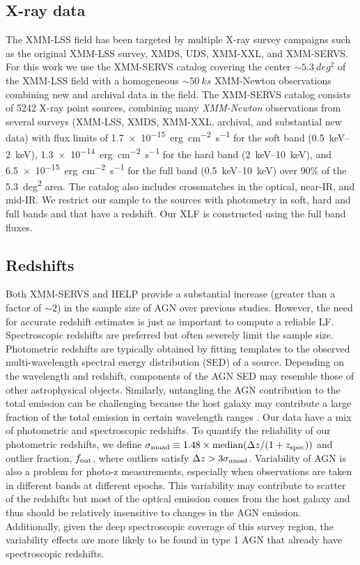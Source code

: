 \documentclass[twocolumn, trackchanges]{aastex63}
\begin{document}
\subsection{X-ray data}
The XMM-LSS field has been targeted by multiple X-ray survey campaigns such as the original XMM-LSS survey, XMDS, UDS, XMM-XXL, and XMM-SERVS.
For this work we use the XMM-SERVS catalog \citep{chen_xmm-servs_2018} covering the center $\sim \SI{5.3}{deg^2}$ of the XMM-LSS field with a homogeneous $\sim \SI{50}{ks}$ XMM-Newton observations combining
new and archival data in the field.
The XMM-SERVS catalog \citep{chen_xmm-servs_2018} consists of 5242 X-ray point sources, combining many \textit{XMM-Newton} observations from several surveys (XMM-LSS, XMDS, XMM-XXL, archival, and substantial new data) with flux limits of \SI{1.7e-15}{erg~cm^{-2}~s^{-1}} for the soft band (\SIrange[range-phrase=--, range-units=single]{0.5}{2}{keV}), \SI{1.3e-14}{erg~cm^{-2}~s^{-1}} for the hard band (\SIrange[range-phrase=--, range-units=single]{2}{10}{keV}), and \SI{6.5e-15}{erg~cm^{-2}~s^{-1}} for the full band (\SIrange[range-phrase=--, range-units=single]{0.5}{10}{keV}) over 90\% of the \SI{5.3}{deg^2} area.
The catalog also includes crossmatches in the optical, near-IR, and mid-IR.
We restrict our sample to the sources with photometry in soft, hard and full bands and that have a redshift.
Our XLF is constructed using the full band fluxes.

\subsection{Redshifts}
Both XMM-SERVS and HELP provide a substantial increase  (greater than a factor of $\sim 2$) in the sample size of AGN over previous studies. 
However, the need for accurate redshift estimates is just as important to compute a reliable LF.
Spectroscopic redshifts are preferred but often severely limit the sample size.
Photometric redshifts are typically obtained by fitting templates to the observed multi-wavelength spectral energy distribution (SED) of a source.
Depending on the wavelength and redshift, components of the AGN SED may resemble those of other astrophysical objects.
Similarly, untangling the AGN contribution to the total emission can be challenging because the host galaxy may contribute a large fraction of the total emission in certain wavelength ranges \citep{salvato_many_2019}.
Our data have a mix of photometric and spectroscopic redshifts.
To quantify the reliability of our photometric redshifts, we define $\sigma_{\rm nmad}\equiv1.48\times\mathrm{median}(\Delta z/(1 + z_{\rm spec}))$ and outlier fraction, $f_{\rm out}$, where outliers satisfy $\Delta z > 3\sigma_{\rm nmad}$.
Variability of AGN \citep{kozlowski2016ApJ...826..118K} is also a problem for photo-z measurements, especially when observations are taken in different bands at different epochs.
This variability may contribute to scatter of the redshifts but most of the optical emission comes from the host galaxy and thus should be relatively insensitive to changes in the AGN emission.
Additionally, given the deep spectroscopic coverage of this survey region, the variability effects are more likely to be found in type 1 AGN that already have spectroscopic redshifts.
\end{document}
